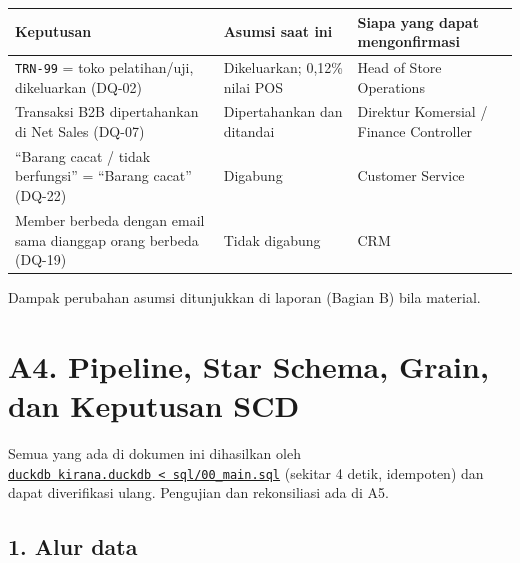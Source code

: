 \documentclass[10pt,a4paper]{article}
\begin{document}
{\def\LTcaptype{none} %
\begin{longtable}[]{@{}
  >{\raggedright\arraybackslash}p{}
  >{\raggedright\arraybackslash}p{}
  >{\raggedright\arraybackslash}p{}@{}}
\toprule\noalign{}
\begin{minipage}[b]{\linewidth}\raggedright
Keputusan
\end{minipage} & \begin{minipage}[b]{\linewidth}\raggedright
Asumsi saat ini
\end{minipage} & \begin{minipage}[b]{\linewidth}\raggedright
Siapa yang dapat mengonfirmasi
\end{minipage} \\
\midrule\noalign{}
\endhead
\bottomrule\noalign{}
\endlastfoot
\texttt{TRN-99} = toko pelatihan/uji, dikeluarkan (DQ-02) & Dikeluarkan; 0,12\% nilai POS & Head of Store Operations \\
Transaksi B2B dipertahankan di Net Sales (DQ-07) & Dipertahankan dan ditandai & Direktur Komersial / Finance Controller \\
``Barang cacat / tidak berfungsi'' = ``Barang cacat'' (DQ-22) & Digabung & Customer Service \\
Member berbeda dengan email sama dianggap orang berbeda (DQ-19) & Tidak digabung & CRM \\
\end{longtable}
}

Dampak perubahan asumsi ditunjukkan di laporan (Bagian B) bila material.

\section{A4. Pipeline, Star Schema, Grain, dan Keputusan SCD}\label{a4.-pipeline-star-schema-grain-dan-keputusan-scd}

Semua yang ada di dokumen ini dihasilkan oleh \href{https://github.com/titan2903/kirana-omnichannel-performance-intelligence/blob/master/sql/00_main.sql}{\texttt{duckdb\ kirana.duckdb\ \textless{}\ sql/00\_\allowbreak{}main.sql}} (sekitar 4 detik,
idempoten) dan dapat diverifikasi ulang. Pengujian dan rekonsiliasi ada di A5.

\subsection{1. Alur data}\label{alur-data}
\end{document}
